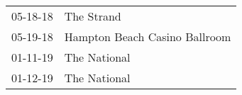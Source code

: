 \begin{supertabular}{p{0.07\textwidth}p{0.23\textwidth}}
 05-18-18 &                     The Strand \\
 05-19-18 &  Hampton Beach Casino Ballroom \\
 01-11-19 &                   The National \\
 01-12-19 &                   The National \\
\end{supertabular}

